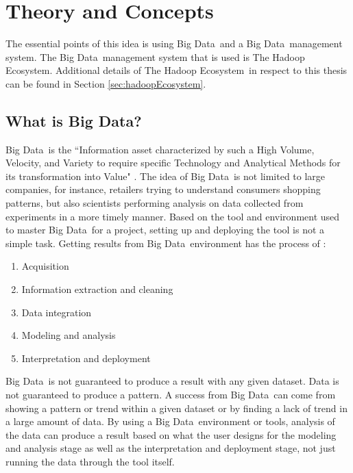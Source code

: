 \documentclass[titlepage,twocolumn]{article}
\newcommand{\HadoopEcosystem}{Hadoop Ecosystem}
\newcommand{\BigData}{Big Data}
\begin{document}
\section{Theory and Concepts}

\par The essential points of this idea is using \BigData\ and a \BigData\ management system. The \BigData\ management system that is used is The \HadoopEcosystem. Additional details of The \HadoopEcosystem\ in respect to this thesis can be found in Section \ref{sec:hadoopEcosystem}.


\subsection{What is \BigData?}

\par \BigData\ is the ``Information asset characterized by such a High Volume, Velocity, and Variety to require specific Technology and Analytical Methods for its transformation into Value" \cite{doi:10.1108/LR-06-2015-0061}. The idea of \BigData\ is not limited to large companies, for instance, retailers trying to understand consumers shopping patterns, but also scientists performing analysis on data collected from experiments in a more timely manner. Based on the tool and environment used to master \BigData\ for a project, setting up and deploying the tool is not a simple task. Getting results from \BigData\ environment has the process of \cite{BigDataAndItsTechnicalChallenges}: 
\begin{enumerate}
	\item Acquisition
	\item Information extraction and cleaning
	\item Data integration
	\item Modeling and analysis
	\item Interpretation and deployment
\end{enumerate}

\par \BigData\ is not guaranteed to produce a result with any given dataset. Data is not guaranteed to produce a pattern. A success from \BigData\ can come from showing a pattern or trend within a given dataset or by finding a lack of trend in a large amount of data. By using a \BigData\ environment or tools, analysis of the data can produce a result based on what the user designs for the modeling and analysis stage as well as the interpretation and deployment stage, not just running the data through the tool itself. 
\end{document}
